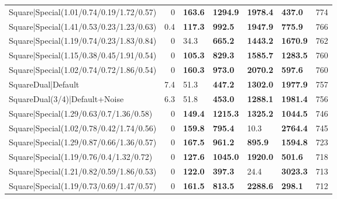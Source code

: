 \begin{tabular}{lrllllr}
 Square|Special(1.01/0.74/0.19/1.72/0.57)                      &             0   & \textbf{163.6} & \textbf{1294.9} & \textbf{1978.4} & \textbf{437.0}  &          774 \\
 Square|Special(1.41/0.53/0.23/1.23/0.63)                      &             0.4 & \textbf{117.3} & \textbf{992.5}  & \textbf{1947.9} & \textbf{775.9}  &          766 \\
 Square|Special(1.19/0.74/0.23/1.83/0.84)                      &             0   & 34.3           & \textbf{665.2}  & \textbf{1443.2} & \textbf{1670.9} &          762 \\
 Square|Special(1.15/0.38/0.45/1.91/0.54)                      &             0   & \textbf{105.3} & \textbf{829.3}  & \textbf{1585.7} & \textbf{1283.5} &          760 \\
 Square|Special(1.02/0.74/0.72/1.86/0.54)                      &             0   & \textbf{160.3} & \textbf{973.0}  & \textbf{2070.2} & \textbf{597.6}  &          760 \\
 SquareDual|Default                                            &             7.4 & 51.3           & \textbf{447.2}  & \textbf{1302.0} & \textbf{1977.9} &          757 \\
 SquareDual(3/4)|Default+Noise                                 &             6.3 & 51.8           & \textbf{453.0}  & \textbf{1288.1} & \textbf{1981.4} &          756 \\
 Square|Special(1.29/0.63/0.7/1.36/0.58)                       &             0   & \textbf{149.4} & \textbf{1215.3} & \textbf{1325.2} & \textbf{1044.5} &          746 \\
 Square|Special(1.02/0.78/0.42/1.74/0.56)                      &             0   & \textbf{159.8} & \textbf{795.4}  & 10.3            & \textbf{2764.4} &          745 \\
 Square|Special(1.29/0.87/0.66/1.36/0.57)                      &             0   & \textbf{167.5} & \textbf{961.2}  & \textbf{895.9}  & \textbf{1594.8} &          723 \\
 Square|Special(1.19/0.76/0.4/1.32/0.72)                       &             0   & \textbf{127.6} & \textbf{1045.0} & \textbf{1920.0} & \textbf{501.6}  &          718 \\
 Square|Special(1.21/0.82/0.59/1.86/0.53)                      &             0   & \textbf{122.0} & \textbf{397.3}  & 24.4            & \textbf{3023.3} &          713 \\
 Square|Special(1.19/0.73/0.69/1.47/0.57)                      &             0   & \textbf{161.5} & \textbf{813.5}  & \textbf{2288.6} & \textbf{298.1}  &          712 \\

\end{tabular}
